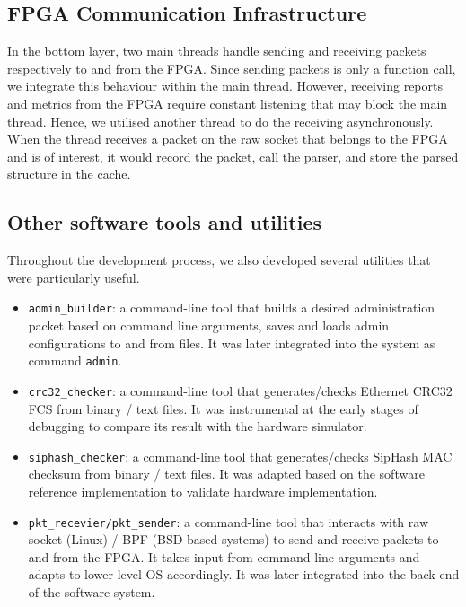 \documentclass[a4paper]{report}
\newcommand{\code}{\texttt}
\begin{document}
\subsection{FPGA Communication Infrastructure}

In the bottom layer, two main threads handle sending and receiving packets respectively to and from the FPGA. Since sending packets is only a function call, we integrate this behaviour within the main thread. However, receiving reports and metrics from the FPGA require constant listening that may block the main thread. Hence, we utilised another thread to do the receiving asynchronously. When the thread receives a packet on the raw socket that belongs to the FPGA and is of interest, it would record the packet, call the parser, and store the parsed structure in the cache.

\subsection{Other software tools and utilities}

Throughout the development process, we also developed several utilities that were particularly useful. 

\begin{itemize}
    \item \code{admin\_builder}: a command-line tool that builds a desired administration packet based on command line arguments, saves and loads admin configurations to and from files. It was later integrated into the system as command \code{admin}.
    \item \code{crc32\_checker}: a command-line tool that generates/checks Ethernet CRC32 FCS from binary / text files. It was instrumental at the early stages of debugging to compare its result with the hardware simulator.
    \item \code{siphash\_checker}: a command-line tool that generates/checks SipHash MAC checksum from binary / text files. It was adapted based on the software reference implementation \cite{aumasson-bernstein-2012} to validate hardware implementation.
    \item \code{pkt\_recevier/pkt\_sender}: a command-line tool that interacts with raw socket (Linux) / BPF (BSD-based systems) to send and receive packets to and from the FPGA. It takes input from command line arguments and adapts to lower-level OS accordingly. It was later integrated into the back-end of the software system.
\end{itemize}
\end{document}
